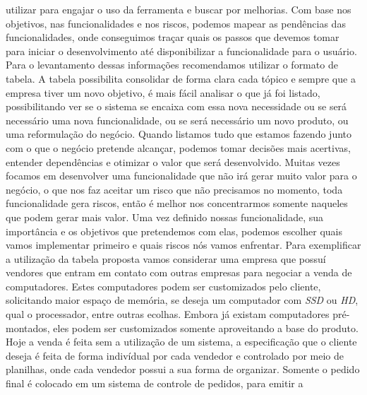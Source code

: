      utilizar para engajar o uso da ferramenta e buscar por melhorias. \newline
      Com base nos objetivos, nas funcionalidades e nos riscos, podemos mapear as
      pendências das funcionalidades, onde conseguimos traçar quais os passos que
      devemos tomar para iniciar o desenvolvimento até disponibilizar a funcionalidade
      para o usuário. \newline
      Para o levantamento dessas informações recomendamos utilizar o formato de
      tabela. A tabela possibilita consolidar de forma clara cada tópico e sempre
      que a empresa tiver um novo objetivo, é mais fácil analisar o que já foi listado,
      possibilitando ver se o sistema se encaixa com essa nova necessidade ou se será
      necessário uma nova funcionalidade, ou se será necessário um novo produto,
      ou uma reformulação do negócio. Quando listamos tudo que estamos fazendo
      junto com o que o negócio pretende alcançar, podemos tomar decisões mais
      acertivas, entender dependências e otimizar o valor que será desenvolvido.
      Muitas vezes focamos em desenvolver uma funcionalidade que não irá gerar
      muito valor para o negócio, o que nos faz aceitar um risco que não precisamos
      no momento, toda funcionalidade gera riscos, então é melhor nos concentrarmos
      somente naqueles que podem gerar mais valor. \newline
      Uma vez definido nossas funcionalidade, sua importância e os objetivos que
      pretendemos com elas, podemos escolher quais vamos implementar primeiro e
      quais riscos nós vamos enfrentar. \newline
      Para exemplificar a utilização da tabela proposta vamos considerar uma
      empresa que possuí vendores que entram em contato com outras empresas para
      negociar a venda de computadores. Estes computadores podem ser customizados
      pelo cliente, solicitando maior espaço de memória, se deseja um computador
      com \textit{SSD} ou \textit{HD}, qual o processador, entre outras ecolhas.
      Embora já existam computadores pré-montados, eles podem ser customizados
      somente aproveitando a base do produto. \newline
      Hoje a venda é feita sem a utilização de um sistema, a especificação que o
      cliente deseja é feita de forma indivídual por cada vendedor e controlado por
      meio de planilhas, onde cada vendedor possui a sua forma de organizar. Somente
      o pedido final é colocado em um sistema de controle de pedidos, para emitir a
